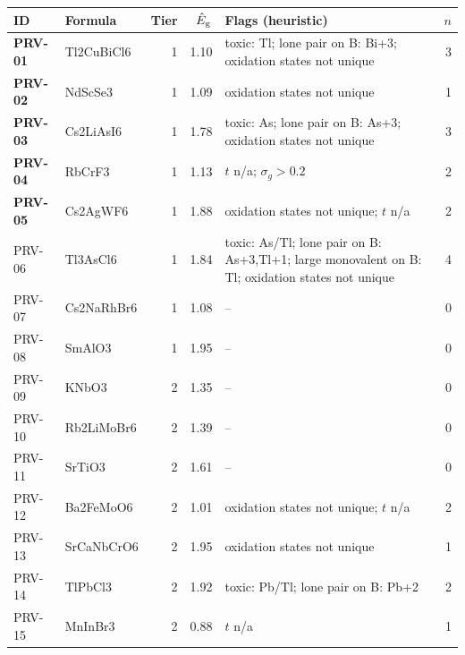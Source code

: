 \begin{tabular}{@{}llrrp{7.2cm}r@{}}\toprule
 ID & Formula & Tier & $\hat E_{\rm g}$ & Flags (heuristic) & $n$ \\\midrule
\textbf{PRV-01} & Tl2CuBiCl6 & 1 & 1.10 & toxic: Tl; lone pair on B: Bi+3; oxidation states not unique & 3 \\
\textbf{PRV-02} & NdScSe3 & 1 & 1.09 & oxidation states not unique & 1 \\
\textbf{PRV-03} & Cs2LiAsI6 & 1 & 1.78 & toxic: As; lone pair on B: As+3; oxidation states not unique & 3 \\
\textbf{PRV-04} & RbCrF3 & 1 & 1.13 & $t$ n/a; $\sigma_g>0.2$ & 2 \\
\textbf{PRV-05} & Cs2AgWF6 & 1 & 1.88 & oxidation states not unique; $t$ n/a & 2 \\
PRV-06 & Tl3AsCl6 & 1 & 1.84 & toxic: As/Tl; lone pair on B: As+3,Tl+1; large monovalent on B: Tl; oxidation states not unique & 4 \\
PRV-07 & Cs2NaRhBr6 & 1 & 1.08 & -- & 0 \\
PRV-08 & SmAlO3 & 1 & 1.95 & -- & 0 \\
PRV-09 & KNbO3 & 2 & 1.35 & -- & 0 \\
PRV-10 & Rb2LiMoBr6 & 2 & 1.39 & -- & 0 \\
PRV-11 & SrTiO3 & 2 & 1.61 & -- & 0 \\
PRV-12 & Ba2FeMoO6 & 2 & 1.01 & oxidation states not unique; $t$ n/a & 2 \\
PRV-13 & SrCaNbCrO6 & 2 & 1.95 & oxidation states not unique & 1 \\
PRV-14 & TlPbCl3 & 2 & 1.92 & toxic: Pb/Tl; lone pair on B: Pb+2 & 2 \\
PRV-15 & MnInBr3 & 2 & 0.88 & $t$ n/a & 1 \\
\bottomrule\end{tabular}

